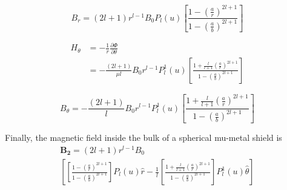\begin{equation}\label{Br}
B_r=(2l+1)r^{l-1}B_0P_l(u)\left[\frac{1-\left(\frac{a}{r}\right)^{2l+1}}{1-\left(\frac{a}{b}\right)^{2l+1}}\right]
\end{equation}


\begin{equation}\label{Ht}
\begin{split}
 H_\theta &=-\frac{1}{r}\frac{\partial \Phi}{\partial \theta}\\
         & =-\frac{(2l+1)}{\mu l}B_0r^{l-1}P_l^1(u)\left[
         \frac{1+\frac{l}{l+1}\left(\frac{a}{r}\right)^{2l+1}}
         {1-\left(\frac{a}{b}\right)^{2l+1}}
         \right]
\end{split}
\end{equation}

\begin{equation}\label{Bt}
B_\theta=-\frac{(2l+1)}{l}B_0r^{l-1}P_l^1(u)\left[\frac{1+\frac{l}{l+1}\left(\frac{a}{r}\right)^{2l+1}}{1-\left(\frac{a}{b}\right)^{2l+1}}\right]
\end{equation}

Finally, the magnetic field inside the bulk of a spherical mu-metal shield is
\begin{multline}\label{B}
\bm{B_2}=(2l+1)r^{l-1} B_0  \\
\left[ \left[\frac{1-\left(\frac{a}{r}\right)^{2l+1}}{1-\left(\frac{a}{b}\right)^{2l+1}}\right]P_l(u) \hat{r} -\frac{1}{l}\left[\frac{1+\frac{l}{l+1}\left(\frac{a}{r}\right)^{2l+1}}{1-\left(\frac{a}{b}\right)^{2l+1}}\right] P_l^1(u)\hat{\theta} \right]
\end{multline}


